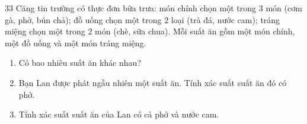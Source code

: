 \documentclass[11pt]{article}
\begin{document}
\begin{probbox}{33}{\relax}
Căng tin trường có thực đơn bữa trưa: món chính chọn một trong $3$ món (cơm gà, phở, bún chả); đồ uống chọn một trong $2$ loại (trà đá, nước cam); tráng miệng chọn một trong $2$ món (chè, sữa chua). Mỗi suất ăn gồm một món chính, một đồ uống và một món tráng miệng.
\begin{enumerate}[label=\alph*),leftmargin=1.5em,itemsep=0pt,topsep=2pt]
\item Có bao nhiêu suất ăn khác nhau?
\item Bạn Lan được phát ngẫu nhiên một suất ăn. Tính xác suất suất ăn đó có phở.
\item Tính xác suất suất ăn của Lan có cả phở và nước cam.
\end{enumerate}
\end{probbox}
\end{document}

